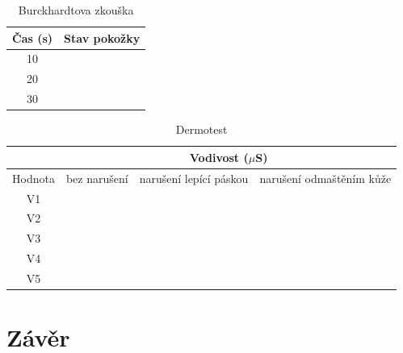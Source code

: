 \documentclass[12pt]{article}
\begin{document}
\renewcommand{\arraystretch}{1.5}

\begin{table}[h]
	\begin{centering}
	\begin{tabular}{|c|c|}
	\hline
	Čas (s) & Stav pokožky \\
	\hline
	10 & \\
	\hline
	20 & \\
	\hline
	30 & \\
	\hline
	\end{tabular}
	\caption{Burckhardtova zkouška}
	\end{centering}
\end{table}

\begin{table}[h]
	\begin{centering}
	\begin{tabular}{|c|c|c|c|}
	\hline
	 & \multicolumn{3}{c|}{Vodivost ($\mu$S)} \\
	\hline
	Hodnota & bez narušení & narušení lepící páskou & narušení odmaštěním kůže \\
	\hline
	V1 & & & \\
	\hline
	V2 & & & \\
	\hline
	V3 & & & \\
	\hline
	V4 & & & \\
	\hline
	V5 & & & \\
	\hline
	\end{tabular}
	\caption{Dermotest}
	\end{centering}
\end{table}

\section{Závěr}
\end{document}
